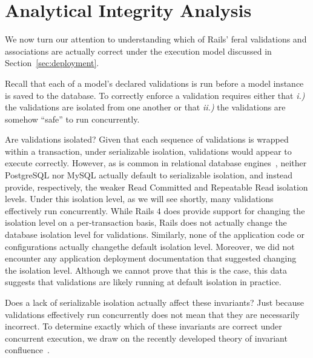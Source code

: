 
\section{Analytical Integrity Analysis}
\label{sec:apps}

We now turn our attention to understanding which of Rails' feral
validations and associations are actually correct under the execution
model discussed in Section~\ref{sec:deployment}. 

Recall that each of a model's declared validations is run before a model instance is saved to
the database. To correctly enforce a validation requires either that
\textit{i.)} the validations are isolated from one another or
that \textit{ii.)} the validations are somehow ``safe'' to run
concurrently.

Are validations isolated? Given that each sequence of validations is
wrapped within a transaction, under serializable isolation,
validations would appear to execute correctly. However, as is common
in relational database engines~\cite{hat-vldb}, neither PostgreSQL nor
MySQL actually default to serializable isolation, and instead provide,
respectively, the weaker Read Committed and Repeatable Read isolation
levels. Under this isolation level, as we will see shortly, many
validations effectively run concurrently. While Rails 4 does provide
support for changing the isolation level on a per-transaction basis,
Rails does not actually change the database isolation level for
validations. Similarly, none of the application code or configurations
actually changethe default isolation level. Moreover, we did not
encounter any application deployment documentation that suggested
changing the isolation level. Although we cannot prove that this is
the case, this data suggests that validations are likely running at
default isolation in practice.

Does a lack of serializable isolation actually affect these
invariants? Just because validations effectively run concurrently does
not mean that they are necessarily incorrect. To determine exactly
which of these invariants are correct under concurrent execution, we
draw on the recently developed theory of invariant
confluence~\cite{coord-avoid}.

